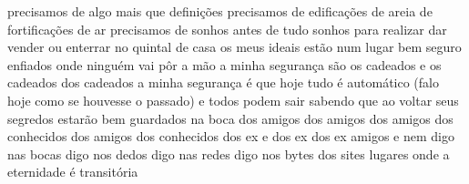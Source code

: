 \begin{poem}
\begin{stanza}
precisamos de algo mais que definições\verseline
precisamos de edificações de areia\verseline
de fortificações de ar\verseline
\qquad \qquad precisamos de sonhos antes de tudo\verseline
\qquad sonhos para realizar dar vender\verseline
ou enterrar no quintal de casa\verseline
\qquad os meus ideais estão num lugar bem seguro\verseline
enfiados onde ninguém vai pôr a mão\verseline
\qquad a minha segurança são os cadeados\verseline
e os cadeados dos cadeados\verseline
\qquad a minha segurança\verseline
é que hoje tudo é automático\verseline
(falo hoje como se houvesse o passado)\verseline
e todos podem sair sabendo que ao voltar\verseline
seus segredos estarão bem guardados\verseline
na boca dos amigos dos amigos dos amigos\verseline
dos conhecidos dos amigos dos conhecidos\verseline
dos ex e dos ex dos ex amigos\verseline
e nem digo nas bocas digo nos dedos\verseline
digo nas redes digo nos bytes dos sites\verseline
\qquad lugares onde a eternidade\verseline
\qquad é transitória
\end{stanza}
\end{poem}